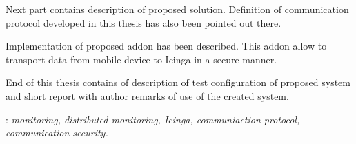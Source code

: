 \begin{titlepage}
{      \indent Next part contains description of proposed
      solution. Definition of communication protocol developed in this
      thesis has also been pointed out there.

      \indent Implementation of proposed addon has been
      described. This addon allow to transport data from mobile device
      to Icinga in a secure manner.

      \indent End of this thesis contains of description of test
      configuration of proposed system and short report with author remarks
      of use of the created system. } \vspace*{1\baselineskip}

    : {\itshape monitoring, distributed
      monitoring, Icinga, communiaction protocol, communication security.}

\end{titlepage}

